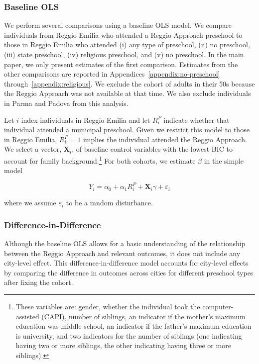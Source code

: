 \subsubsection{Baseline OLS}
We perform several comparisons using a baseline OLS model. We compare individuals from Reggio Emilia who attended a Reggio Approach preschool to those in Reggio Emilia who attended (i) any type of preschool, (ii) no preschool, (iii) state preschool, (iv) religious preschool, and (v) no preschool. In the main paper, we only present estimates of the first comparison. Estimates from the other comparisons are reported in Appendices~\ref{appendix:no-preschool} through~\ref{appendix:religious}. We exclude the cohort of adults in their 50s because the Reggio Approach was not available at that time. We also exclude individuals in Parma and Padova from this analysis.

Let $i$ index individuals in Reggio Emilia and let $R_i^{P}$ indicate whether that individual attended a municipal preschool. Given we restrict this model to those in Reggio Emilia, $R_i^{P} = 1$ implies the individual attended the Reggio Approach. We select a vector, $\bm{X}_i$, of baseline control variables with the lowest BIC to account for family background.\footnote{These variables are: gender, whether the individual took the computer-assisted (CAPI), number of siblings, an indicator if the mother's maximum education was middle school, an indicator if the father's maximum education is university, and two indicators for the number of siblings (one indicating having two or more siblings, the other indicating having three or more siblings).} For both cohorts, we estimate $\beta$ in the simple model

\begin{equation}
	Y_i = \alpha_0 + \alpha_1 R_i^{P} + \bm{X}_i\gamma + \varepsilon_i
	\label{eq:ra-v-none}
\end{equation}

\noindent where we assume $\varepsilon_i$ to be a random disturbance. 

\subsubsection{Difference-in-Difference}
Although the baseline OLS allows for a basic understanding of the relationship between the Reggio Approach and relevant outcomes, it does not include any city-level effect. This difference-in-difference model accounts for city-level effects by comparing the difference in outcomes across cities for different preschool types after fixing the cohort. 

